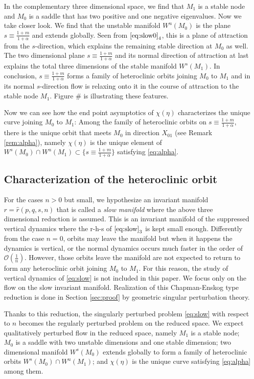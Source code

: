\documentclass[a4paper,11pt]{article}
\def\BO{{\mathcal{O}}}
\begin{document}
In the complementary three dimensional space, we find that $M_1$ is a stable node and $M_0$ is a saddle that has two positive and one negative eigenvalues.  Now we take closer look. We find that the unstable manifold $W^u(M_0)$ is the plane $s\equiv \frac{1+m}{1+\alpha}$ and extends globally. Seen from $\eqref{eq:slow0}_4$, this is a plane of attraction from the $s$-direction, which explains the remaining stable direction at $M_0$ as well. The two dimensional plane $s\equiv \frac{1+m}{1+\alpha}$ and its normal direction of attraction at last explains the total three dimensions of the stable manifold $W^s(M_1)$. In conclusion, $s\equiv\frac{1+m}{1+\alpha}$ forms a family of heteroclinic orbits joining $M_0$ to $M_1$ and in its normal $s$-direction flow is relaxing onto it in the course of attraction to the stable node $M_1$. Figure \# is illustrating these features.

Now we can see how the end point asymptotics of $\chi(\eta)$ characterizes the unique curve joining $M_0$ to $M_1$: Among the family of heteroclinic orbits on $s\equiv\frac{1+m}{1+\alpha}$, there is the unique orbit that meets $M_0$ in direction $X_{01}$ (see Remark \ref{rem:alpha}), namely $\chi(\eta)$ is the unique element of $W^s(M_0)\cap W^u(M_1)\subset \{s\equiv \frac{1+m}{1+\alpha}\}$  satisfying \eqref{eq:alpha}.

\subsection{Characterization of the heteroclinic orbit}
For the cases $n>0$ but small, we hypothesize an invariant manifold $r=\hat{r}(p,q,s,n)$ that is called a {\it slow manifold} where the above three dimensional reduction is assumed. This is an invariant manifold of the suppressed vertical dynamics where the r-h-s of $\eqref{eq:slow}_3$ is kept small enough. Differently from the case $n=0$, orbits may leave the manifold but when it happens the dynamics is vertical, or the normal dynamics occurs much faster in the order of $\BO(\frac{1}{n})$. However, those orbits leave the manifold are not expected to return to form any heteroclinic orbit joining $M_0$ to $M_1$. For this reason, the study of vertical dynamics of \eqref{eq:slow} is not included in this paper. We focus only on the flow on the slow invariant manifold. Realization of this Chapman-Enskog type reduction is done in Section \ref{sec:proof} by geometric singular perturbation theory.

Thanks to this reduction, the singularly perturbed problem \eqref{eq:slow} with respect to $n$ becomes the regularly perturbed problem on the reduced space. We expect qualitatively perturbed flow in the reduced space, namely
$M_1$ is a stable node; $M_0$ is a saddle with two unstable dimensions and one stable dimension; two dimensional manifold $W^s(M_0)$ extends globally to form a family of heteroclinic orbits $W^s(M_0)\cap W^u(M_1)$; and $\chi(\eta)$ is the unique curve satisfying \eqref{eq:alpha} among them.
\end{document}
